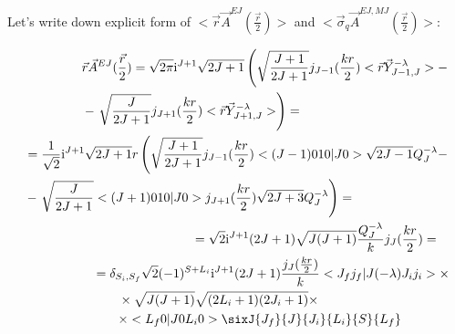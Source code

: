 Let's write down explicit form of $<\vec{r}\vec{A}^{EJ}(\frac{\vec{r}}{2})>$ and $<\vec{\sigma}_{q}\vec{A}^{EJ, MJ}(\frac{\vec{r}}{2})>$:

\begin{align}
    \begin{split}
        &\vec{r} \vec{A}^{EJ}(\frac{\vec{r}}{2}) = \sqrt{2\pi} \mathrm{i}^{J+1} \sqrt{2J+1} \left( \sqrt{\frac{J+1}{2J+1}} j_{J-1}(\frac{kr}{2})<\vec{r} \vec{Y}^{-\lambda}_{J-1, J}> - \right.\\
        &- \left. \sqrt{\frac{J}{2J+1}} j_{J+1}(\frac{kr}{2}) <\vec{r} \vec{Y}_{J+1, J}^{-\lambda}> \right) =
    \end{split}\\
    \begin{split}
        &= \frac{1}{\sqrt{2}} \mathrm{i}^{J+1} \sqrt{2J+1} r \left( \sqrt{\frac{J+1}{2J+1}} j_{J-1}(\frac{kr}{2}) <(J-1) 0 1 0 | J 0> \sqrt{2J-1} Q_{J}^{- \lambda} - \right.\\
        &- \left. \sqrt{\frac{J}{2J+1}} <(J+1) 0 1 0 | J 0> j_{J+1}(\frac{kr}{2}) \sqrt{2J+3} Q_{J}^{- \lambda} \right) =
    \end{split}\\
    \begin{split}
        &= \sqrt{2} \mathrm{i}^{J+1} (2J+1) \sqrt{J (J+1)}  \frac{Q_{J}^{- \lambda}}{k} j_J(\frac{k r}{2}) =
    \end{split}\\
    \begin{split}
        &= \delta_{S_i, S_f} \sqrt{2} (-1)^{ S + L_i} \mathrm{i}^{J+1} (2J+1) \frac{j_J(\frac{k r}{2})}{k} <J_f j_f | J (-\lambda) J_i j_i> \times \\
        &\qquad\times \sqrt{J (J+1)} \sqrt{(2L_i+1)(2J_i+1)} \times \\
        &\qquad\times <L_f 0 | J 0 L_i 0> \sixJ{J_f}{J}{J_i}{L_i}{S}{L_f}
    \end{split}
\end{align}

